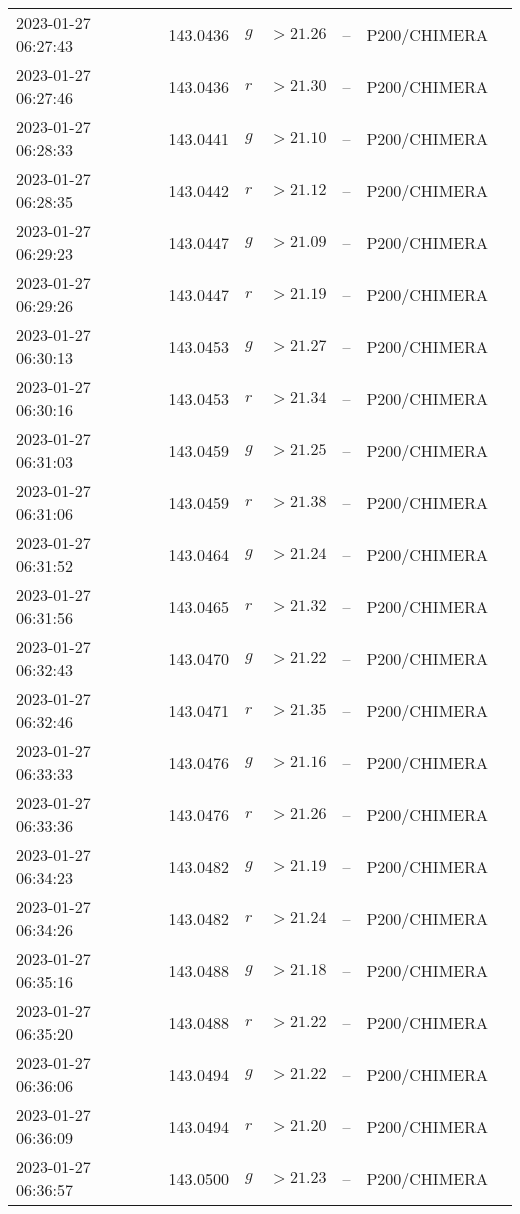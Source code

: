 \documentclass{nature_plusfigure}
\begin{document}
\begin{supplement}
\begin{center}
\begin{longtable}{lllllll}
2023-01-27 06:27:43 & 143.0436 & $g$ & $>21.26$ & -- & P200/CHIMERA &  \\ 
2023-01-27 06:27:46 & 143.0436 & $r$ & $>21.30$ & -- & P200/CHIMERA &  \\ 
2023-01-27 06:28:33 & 143.0441 & $g$ & $>21.10$ & -- & P200/CHIMERA &  \\ 
2023-01-27 06:28:35 & 143.0442 & $r$ & $>21.12$ & -- & P200/CHIMERA &  \\ 
2023-01-27 06:29:23 & 143.0447 & $g$ & $>21.09$ & -- & P200/CHIMERA &  \\ 
2023-01-27 06:29:26 & 143.0447 & $r$ & $>21.19$ & -- & P200/CHIMERA &  \\ 
2023-01-27 06:30:13 & 143.0453 & $g$ & $>21.27$ & -- & P200/CHIMERA &  \\ 
2023-01-27 06:30:16 & 143.0453 & $r$ & $>21.34$ & -- & P200/CHIMERA &  \\ 
2023-01-27 06:31:03 & 143.0459 & $g$ & $>21.25$ & -- & P200/CHIMERA &  \\ 
2023-01-27 06:31:06 & 143.0459 & $r$ & $>21.38$ & -- & P200/CHIMERA &  \\ 
2023-01-27 06:31:52 & 143.0464 & $g$ & $>21.24$ & -- & P200/CHIMERA &  \\ 
2023-01-27 06:31:56 & 143.0465 & $r$ & $>21.32$ & -- & P200/CHIMERA &  \\ 
2023-01-27 06:32:43 & 143.0470 & $g$ & $>21.22$ & -- & P200/CHIMERA &  \\ 
2023-01-27 06:32:46 & 143.0471 & $r$ & $>21.35$ & -- & P200/CHIMERA &  \\ 
2023-01-27 06:33:33 & 143.0476 & $g$ & $>21.16$ & -- & P200/CHIMERA &  \\ 
2023-01-27 06:33:36 & 143.0476 & $r$ & $>21.26$ & -- & P200/CHIMERA &  \\ 
2023-01-27 06:34:23 & 143.0482 & $g$ & $>21.19$ & -- & P200/CHIMERA &  \\ 
2023-01-27 06:34:26 & 143.0482 & $r$ & $>21.24$ & -- & P200/CHIMERA &  \\ 
2023-01-27 06:35:16 & 143.0488 & $g$ & $>21.18$ & -- & P200/CHIMERA &  \\ 
2023-01-27 06:35:20 & 143.0488 & $r$ & $>21.22$ & -- & P200/CHIMERA &  \\ 
2023-01-27 06:36:06 & 143.0494 & $g$ & $>21.22$ & -- & P200/CHIMERA &  \\ 
2023-01-27 06:36:09 & 143.0494 & $r$ & $>21.20$ & -- & P200/CHIMERA &  \\ 
2023-01-27 06:36:57 & 143.0500 & $g$ & $>21.23$ & -- & P200/CHIMERA &  \\ 

\end{longtable}
\end{center}
\end{supplement}
\end{document}
